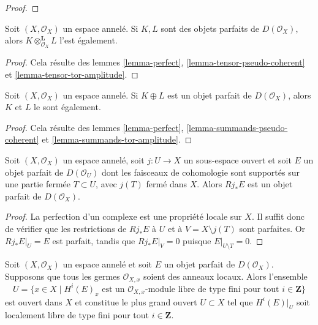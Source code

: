 {\begin{proof}
\end{proof}

\begin{lemma}

\label{lemma-tensor-perfect}
Soit $(X, \mathcal{O}_X)$ un espace annelé. Si $K, L$ sont des objets parfaits de $D(\mathcal{O}_X)$, alors $K \otimes_{\mathcal{O}_X}^\mathbf{L} L$ l'est également.
\end{lemma}

\begin{proof}
Cela résulte des lemmes \ref{lemma-perfect}, \ref{lemma-tensor-pseudo-coherent} et \ref{lemma-tensor-tor-amplitude}.
\end{proof}

\begin{lemma}

\label{lemma-summands-perfect}
Soit $(X, \mathcal{O}_X)$ un espace annelé. Si $K \oplus L$ est un objet parfait de $D(\mathcal{O}_X)$, alors $K$ et $L$ le sont également.
\end{lemma}

\begin{proof}
Cela résulte des lemmes \ref{lemma-perfect}, \ref{lemma-summands-pseudo-coherent} et \ref{lemma-summands-tor-amplitude}.
\end{proof}

\begin{lemma}

\label{lemma-pushforward-perfect}
Soit $(X, \mathcal{O}_X)$ un espace annelé, soit $j : U \to X$ un sous-espace ouvert et soit $E$ un objet parfait de $D(\mathcal{O}_U)$ dont les faisceaux de cohomologie sont supportés sur une partie fermée $T \subset U$, avec $j(T)$ fermé dans $X$. Alors $Rj_*E$ est un objet parfait de $D(\mathcal{O}_X)$.
\end{lemma}

\begin{proof}
La perfection d'un complexe est une propriété locale sur $X$. Il suffit donc de vérifier que les restrictions de $Rj_*E$ à $U$ et à $V = X \setminus j(T)$ sont parfaites. Or $Rj_*E|_U = E$ est parfait, tandis que $Rj_*E|_V = 0$ puisque $E|_{U \setminus T} = 0$.
\end{proof}

\begin{lemma}

\label{lemma-perfect-max-open-coh-loc-free}
Soit $(X, \mathcal{O}_X)$ un espace annelé et soit $E$ un objet parfait de $D(\mathcal{O}_X)$. Supposons que tous les germes $\mathcal{O}_{X, x}$ soient des anneaux locaux. Alors l'ensemble $$
U =
\{x \in X \mid
H^i(E)_x\text{ est un }
\mathcal{O}_{X, x}\text{-module libre de type fini pour tout }i\in \mathbf{Z}\}
$$ est ouvert dans $X$ et constitue le plus grand ouvert $U \subset X$ tel que $H^i(E)|_U$ soit localement libre de type fini pour tout $i \in \mathbf{Z}$.
\end{lemma}

}
